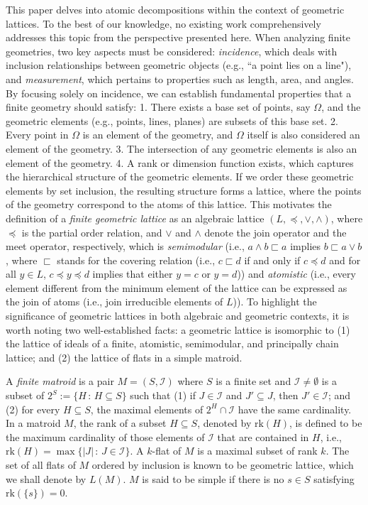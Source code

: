 \documentclass[12pt]{extarticle}
\begin{document}
	
	This paper delves into atomic decompositions within the context of geometric lattices. To the best of our knowledge, no existing work comprehensively addresses this topic from the perspective presented here. When analyzing finite geometries, two key aspects must be considered: \emph{incidence}, which deals with inclusion relationships between geometric objects (e.g., ``a point lies on a line"), and \emph{measurement}, which pertains to properties such as length, area, and angles. By focusing solely on incidence, we can establish fundamental properties that a finite geometry should satisfy: 1. There exists a base set of points, say \(\Omega\), and the geometric elements (e.g., points, lines, planes) are subsets of this base set. 2. Every point in \(\Omega\) is an element of the geometry, and \(\Omega\) itself is also considered an element of the geometry. 3. The intersection of any geometric elements is also an element of the geometry. 4. A rank or dimension function exists, which captures the hierarchical structure of the geometric elements. If we order these geometric elements by set inclusion, the resulting structure forms a lattice, where the points of the geometry correspond to the atoms of this lattice. This motivates the definition of a \emph{finite geometric lattice} as an algebraic lattice $(L, \preceq, \vee,\wedge)$, where $\preceq$ is the partial order relation, and $\vee$ and $\wedge$ denote the join operator and the meet operator, respectively, which is \emph{semimodular} (i.e., $a\wedge b \sqsubset a$ implies $b\sqsubset a\vee b$, where $\sqsubset$ stands for the covering relation (i.e., $c \sqsubset d$ if and only if $c\preceq d$ and for all $y\in L$, $c\preceq y\preceq d$ implies that either $y=c$ or $y=d$)) and \emph{atomistic} (i.e., every element different from the minimum element of the lattice can be expressed as the join of atoms (i.e., join irreducible elements of $L$)). To highlight the significance of geometric lattices in both algebraic and geometric contexts, it is worth noting two well-established facts: a geometric lattice is isomorphic to (1) the lattice of ideals of a finite, atomistic, semimodular, and principally chain lattice; and (2) the lattice of flats in a simple matroid.
	
	A \emph{finite matroid} is a pair $M=(S,\mathcal{I})$ where $S$ is a finite set and $\mathcal{I}\neq\emptyset$ is a subset of $2^S:=\{H\,:\, H\subseteq S\}$ such that (1) if $J\in\mathcal{I}$ and $J'\subseteq J$, then $J'\in\mathcal{I}$; and (2) for every $H\subseteq S$, the maximal elements of $2^{H}\cap \mathcal{I}$ have the same cardinality. In a matroid $M$, the rank of a subset $H\subseteq S$, denoted by $\text{rk}(H)$, is defined to be the maximum cardinality of those elements of $\mathcal{I}$ that are contained in $H$, i.e., $\text{rk}(H)=\max\{|J|\,:\, J\in \mathcal{I}\}$. A $k$-flat of $M$ is a maximal subset of rank $k$. The set of all flats of $M$ ordered by inclusion is known to be geometric lattice, which we shall denote by $L(M)$. $M$ is said to be simple if there is no $s\in S$ satisfying $\text{rk}(\{s\})=0$.
	
\end{document}

